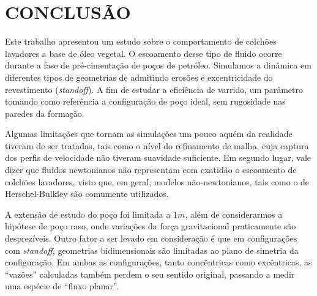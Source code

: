 \section{CONCLUSÃO}

Este trabalho apresentou um estudo sobre o comportamento de colchões lavadores a base de óleo vegetal. O escoamento desse tipo de fluido ocorre durante a fase de pré-cimentação de poços de petróleo. Simulamos a dinâmica em diferentes tipos de geometrias de admitindo erosões e excentricidade do revestimento (\textit{standoff}). A fim de estudar a eficiência de varrido, um parâmetro tomando como referência a configuração de poço ideal, sem rugosidade nas paredes da formação. 


Algumas limitações que tornam as simulações um pouco aquém da realidade tiveram de ser tratadas, tais como o nível do refinamento de malha, cuja captura dos perfis de velocidade não tiveram suavidade suficiente. Em segundo lugar, vale dizer que fluidos newtonianos não representam com exatidão o escoamento de colchões lavadores, visto que, em geral, modelos não-newtonianos, tais como o de Herschel-Bulkley são comumente utilizados. 

A extensão de estudo do poço foi limitada a $1m$, além de considerarmos a hipótese de poço raso, onde variações da força gravitacional praticamente são desprezíveis. %
Outro fator a ser levado em consideração é que em configurações com \emph{standoff}, geometrias bidimensionais são limitadas ao plano de simetria da configuração. Em ambas as configurações, tanto concêntricas como excêntricas, as ``vazões'' calculadas também perdem o seu sentido original, passando a medir uma espécie de ``fluxo planar''. 

